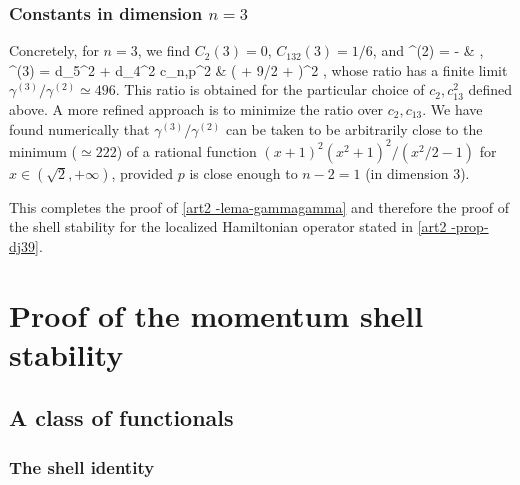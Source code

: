 \documentclass[11pt]{article}
\numberwithin{table}{section}
\numberwithin{equation}{section}
\numberwithin{table}{section}
\numberwithin{figure}{section}
\begin{document}

\subsubsection{\texorpdfstring{Constants in dimension $n=3$}{Constants in dimension n=3}}

Concretely, for $n=3$, we find $C_2(3)=0$, $C_{132}(3) =  1/6$, and 
\be
\aligned
\gamma^{(2)} =  - 
&   ,
\\
\gamma^{(3)} = d_5^2 +  d_4^2 c_{n,p}^2 &  \Bigl(  + 9/2 +  \Bigr)^2  ,
\endaligned
\ee
whose ratio has a finite limit $\gamma^{(3)}/\gamma^{(2)}\simeq 496$.
This ratio is obtained for the particular choice of $c_2,c_{13}^2$ defined above.
A more refined approach is to minimize the ratio over $c_2,c_{13}$.  We have found numerically that $\gamma^{(3)}/\gamma^{(2)}$ can be taken to be arbitrarily close to the minimum ($\simeq 222$) of a rational function $(x+1)^2(x^2+1)^2/(x^2/2 - 1)$ for $x\in(\sqrt{2},+\infty)$, provided $p$ is close enough to $n- 2=1$ (in dimension $3$).

This completes the proof of \autoref{art2 -lema-gammagamma} and therefore the proof of the shell stability for the localized Hamiltonian operator stated in \autoref{art2 -prop-dj39}. 


\section{Proof of the momentum shell stability}
\label{section-9}

\subsection{A class of functionals}

\subsubsection{The shell identity}
\end{document}
